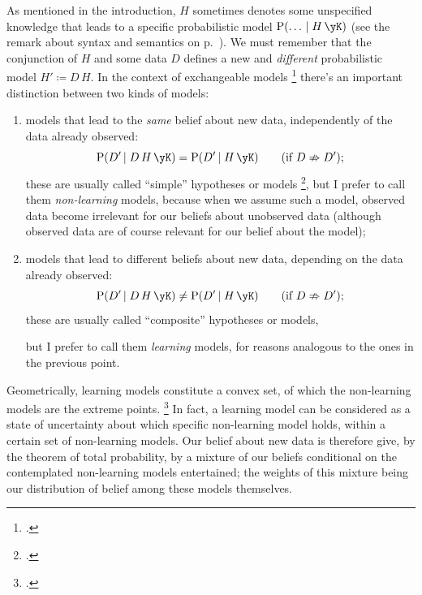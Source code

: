 \documentclass[\ifafour a4paper,12pt,\else a5paper,10pt,\fi%
onecolumn,oneside,article,%
british%
]{memoir}
\theoremstyle{remark}
\theoremstyle{innote}
\newcommand*{\citep}{\footcites}
\newcommand*{\defd}{\coloneqq}
\newcommand*{\p}{\mathrm{P}}%
\renewcommand*{\|}[1][]{\nonscript\,#1\vert\nonscript\;\mathopen{}}
\newcommand*{\sect}{\S}%
\begin{document}
As mentioned in the introduction, $H$ sometimes denotes some unspecified
knowledge that leads to a specific probabilistic model
$\p(\dotso \| H \, \yK)$ (see the remark about syntax and semantics on
p.~\pageref{note:syntax}). We must remember that the conjunction of $H$ and
some data $D$  defines a new and \emph{different} probabilistic model
$H' \defd D \, H$. In the context of exchangeable models
\citep[\sect~4.2]{bernardoetal1994_r2000}{dawid2013,definetti1937,kingman1978,kochetal1982}[see
also][]{diaconisetal1980} there's an important distinction between two
kinds of models:
\begin{enumerate}[label=(\alph*)]
\item models that lead to the \emph{same} belief about new data,
  independently of the data already observed:
  \begin{equation}
  \label{eq:irrelevance_data}
  \p(D' \| D \, H \, \yK) = \p(D' \| H \, \yK)
  \qquad\text{(if $D \nRightarrow D'$)};
\end{equation}
these are usually called \enquote{simple} hypotheses or models
\citep[\sect~6.1.4]{bernardoetal1994_r2000}, but I prefer to call them
\emph{non-learning} models, because when we assume such a model, observed
data become irrelevant for our beliefs about unobserved data (although
observed data are of course relevant for our belief about the model);
\item models that lead to different beliefs about new data, depending on
  the data already observed:
  \begin{equation}
  \label{eq:irrelevance_data}
  \p(D' \| D \, H \, \yK) \ne \p(D' \| H \, \yK)
  \qquad\text{(if $D \nRightarrow D'$)};
\end{equation}
these are usually called \enquote{composite} hypotheses or models,\addtocounter{footnote}{-1}\footnotemark{}%
but I prefer to call them \emph{learning} models, for reasons analogous to
the ones in the previous point.
\end{enumerate}
Geometrically, learning models constitute a convex set, of which the
non-learning models are the extreme points.
\footcites{lauritzen1974,lauritzen1982_r1988,lauritzen1984,barndorffnielsen1978_r2014,dynkin1978}[gives
a terse summary]{dawid2013} In fact, a learning model can be considered as
a state of uncertainty about which specific non-learning model holds,
within a certain set of non-learning models. Our belief about new data is
therefore give, by the theorem of total probability, by a mixture of our
beliefs conditional on the contemplated non-learning models entertained;
the weights of this mixture being our distribution of belief among these
models themselves. 
\end{document}
